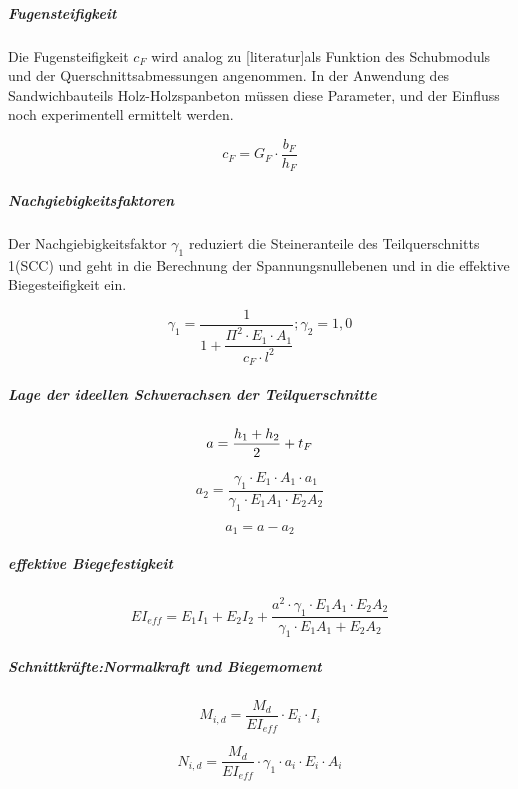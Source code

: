 \subparagraph{Fugensteifigkeit}
 Die Fugensteifigkeit $c_{F}$ wird analog zu [literatur]als Funktion des Schubmoduls und der
Querschnittsabmessungen angenommen. In der Anwendung des Sandwichbauteils
Holz-Holzspanbeton müssen diese Parameter, und der Einfluss noch experimentell
ermittelt werden.

\begin{equation}
c_{F}=G_{F}\cdot\dfrac{b_{F}}{h_{F}}
\end{equation}

\subparagraph{Nachgiebigkeitsfaktoren} Der Nachgiebigkeitsfaktor 
$\gamma_{1}$ reduziert die Steineranteile des
Teilquerschnitts 1(SCC) und geht in die Berechnung der Spannungsnullebenen und in die
effektive Biegesteifigkeit ein. 

\begin{equation}
\gamma_{1}=\dfrac{1}{1+\dfrac{\Pi^{2}\cdot E_{1}\cdot A_{1}}{c_{F} \cdot l^{2}}};
\gamma_{2}=1,0
\end{equation}

\subparagraph{Lage der ideellen Schwerachsen der Teilquerschnitte}

\begin{equation}
a=\dfrac{h_{1}+h_{2}}{2}+t_{F} \\\\
\end{equation}

\begin{equation}
a_{2}=\dfrac{\gamma_{1} \cdot E_{1} \cdot A_{1} \cdot a_{1}}{\gamma_{1} \cdot E_{1}A_{1} \cdot E_{2}A_{2}}
\end{equation}

\begin{equation}
a_{1}=a-a_{2}
\end{equation}



\subparagraph{effektive Biegefestigkeit}
\begin{equation}
EI_{eff}=E_{1}I_{1}+E_{2}I_{2}+\dfrac{a^{2} \cdot \gamma_{1} \cdot E_{1}A_{1} \cdot E_{2}A_{2}}{\gamma_{1} \cdot E_{1}A_{1} + E_{2}A_{2}}
\end{equation}


\subparagraph{Schnittkräfte:Normalkraft und Biegemoment}
\begin{equation}
M_{i,d}=\dfrac{M_{d}}{EI_{eff}} \cdot E_{i} \cdot I_{i}
\end{equation}


\begin{equation}
N_{i,d}=\dfrac{M_{d}}{EI_{eff}} \cdot \gamma_{1} \cdot a_{i} \cdot E_{i} \cdot A_{i}
\end{equation}

